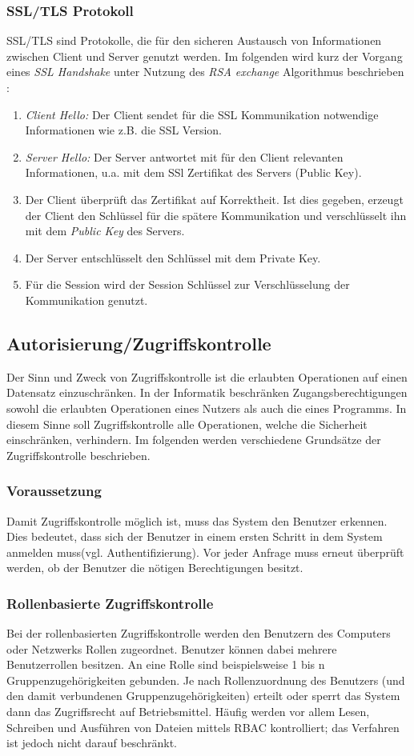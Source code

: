 \subsubsection{SSL/TLS Protokoll}
SSL/TLS sind Protokolle, die für den sicheren Austausch von Informationen zwischen Client und Server genutzt werden. Im folgenden wird kurz der Vorgang eines \textit{SSL Handshake} unter Nutzung des \textit{RSA exchange} Algorithmus beschrieben :
\begin{enumerate}
\item \textit{Client Hello:} Der Client sendet für die SSL Kommunikation notwendige Informationen wie z.B. die SSL Version.
\item \textit{Server Hello:} Der Server antwortet mit für den Client relevanten Informationen, u.a. mit dem SSl Zertifikat des Servers (Public Key).
\item  Der Client überprüft das Zertifikat auf Korrektheit.  Ist dies gegeben, erzeugt der Client den Schlüssel für die spätere Kommunikation und verschlüsselt ihn mit dem \textit{Public Key} des Servers.
\item Der Server entschlüsselt den Schlüssel mit dem Private Key.
\item Für die Session wird der Session Schlüssel zur Verschlüsselung der Kommunikation genutzt.
\end{enumerate}	
\subsection{Autorisierung/Zugriffskontrolle}
Der Sinn und Zweck von Zugriffskontrolle ist die erlaubten Operationen auf einen Datensatz einzuschränken. In der Informatik beschränken Zugangsberechtigungen sowohl die erlaubten Operationen eines Nutzers als auch die eines Programms. In diesem Sinne soll Zugriffskontrolle alle Operationen, welche die Sicherheit einschränken, verhindern. Im folgenden werden verschiedene Grundsätze der Zugriffskontrolle beschrieben.

\subsubsection{Voraussetzung}
Damit Zugriffskontrolle möglich ist, muss das System den Benutzer erkennen. Dies bedeutet, dass sich der Benutzer in einem ersten Schritt in dem System anmelden muss(vgl. Authentifizierung). Vor jeder Anfrage muss erneut überprüft werden, ob der Benutzer die nötigen Berechtigungen besitzt.
\subsubsection{Rollenbasierte Zugriffskontrolle}
Bei der rollenbasierten Zugriffskontrolle werden den Benutzern des Computers oder Netzwerks Rollen zugeordnet. Benutzer können dabei mehrere Benutzerrollen besitzen. An eine Rolle sind beispielsweise 1 bis n Gruppenzugehörigkeiten gebunden. Je nach Rollenzuordnung des Benutzers (und den damit verbundenen Gruppenzugehörigkeiten) erteilt oder sperrt das System dann das Zugriffsrecht auf Betriebsmittel. Häufig werden vor allem Lesen, Schreiben und Ausführen von Dateien mittels RBAC kontrolliert; das Verfahren ist jedoch nicht darauf beschränkt.

